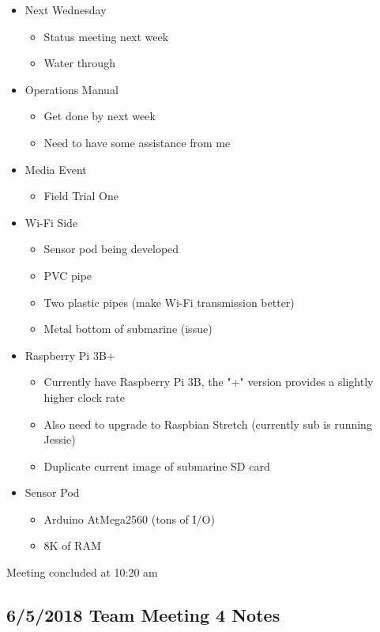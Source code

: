 \documentclass[12pt]{article}
\begin{document}
		\noindent
		\begin{itemize}
			\item Next Wednesday
			\begin{itemize}
				\item Status meeting next week
				\item Water through
			\end{itemize}
			\item Operations Manual
			\begin{itemize}
				\item Get done by next week
				\item Need to have some assistance from me
			\end{itemize}
			\item Media Event
			\begin{itemize}
				\item Field Trial One
			\end{itemize}
			\item Wi-Fi Side
			\begin{itemize}
				\item Sensor pod being developed
				\item PVC pipe
				\item Two plastic pipes (make Wi-Fi transmission better)
				\item Metal bottom of submarine (issue)
			\end{itemize}
			\item Raspberry Pi 3B+
			\begin{itemize}
				\item Currently have Raspberry Pi 3B, the "+" version provides a slightly higher clock rate
				\item Also need to upgrade to Raspbian Stretch (currently sub is running Jessie)
				\item Duplicate current image of submarine SD card
			\end{itemize}
			\item Sensor Pod
			\begin{itemize}
				\item Arduino AtMega2560 (tons of I/O)
				\item 8K of RAM
			\end{itemize}
		\end{itemize}
	
		\noindent
		Meeting concluded at 10:20 am
	
	
		\subsection{6/5/2018 Team Meeting 4 Notes}
	
\end{document}
